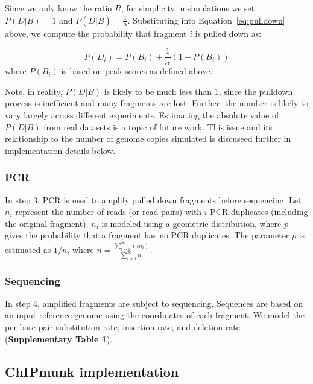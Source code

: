 \documentclass[12pt]{article}
\begin{document}
Since we only know the ratio $R$, for simplicity in simulations we set $P(D|B)=1$ and $P(D|\overline{B})=\frac{1}{\alpha}$.
Substituting into Equation~\ref{eq:pulldown} above, we compute the probability that fragment $i$ is pulled down as:

\begin{equation}
  P(D_i) = P(B_i) + \frac{1}{\alpha}(1-P(B_i))
\end{equation}
where $P(B_i)$ is based on peak scores as defined above.

Note, in reality, $P(D|B)$ is likely to be much less than 1, since the pulldown process is inefficient and many fragments are lost.
Further, the number is likely to vary largely across different experiments.
Estimating the absolute value of $P(D|B)$ from real datasets is a topic of future work.
This issue and its relationship to the number of genome copies simulated is discuseed further in implementation details below.

\subsubsection*{PCR}

In step 3, PCR is used to amplify pulled down fragments before sequencing.
Let $n_i$ represent the number of reads (or read pairs) with $i$ PCR duplicates (including the original fragment).
$n_i$ is modeled using a geometric distribution, where $p$ gives the probability that a fragment has no PCR duplicates.
The parameter $p$ is estimated as $1/\overline{n}$, where $\overline{n} = \frac{\sum_{i=1}^\infty (i  n_i)}{\sum_{i=1}^\infty n_i}$.

\subsubsection*{Sequencing}

In step 4, amplified fragments are subject to sequencing.
Sequences are based on an input reference genome using the coordinates of each fragment.
We model the per-base pair substitution rate, insertion rate, and deletion rate (\textbf{Supplementary Table 1}).

\subsection*{ChIPmunk implementation}
\end{document}

